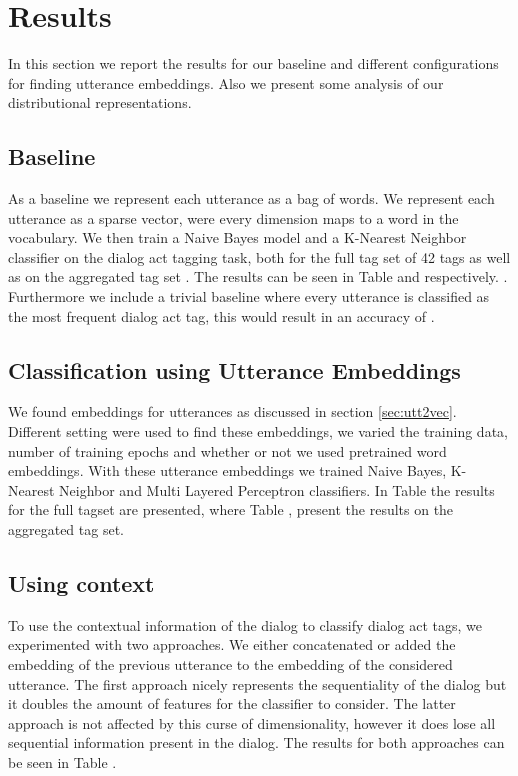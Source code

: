 \section{Results}\label{sec:results}
In this section we report the results for our baseline and different configurations for finding utterance embeddings. Also we present some analysis of our distributional representations.

\subsection{Baseline}
As a baseline we represent each utterance as a bag of words. We represent each utterance as a sparse vector, were every dimension maps to a word in the vocabulary. We then train a Naive Bayes model and a K-Nearest Neighbor classifier on the dialog act tagging task, both for the full tag set of 42 tags as well as on the aggregated tag set . The results can be seen in Table  and  respectively. . Furthermore we include a trivial baseline where every utterance is classified as the most frequent dialog act tag, this would result in an accuracy of .

\subsection{Classification using Utterance Embeddings}
We found embeddings for utterances as discussed in section \ref{sec:utt2vec}. Different setting were used to find these embeddings, we varied the training data, number of training epochs and whether or not we used pretrained word embeddings. With these utterance embeddings we trained Naive Bayes, K-Nearest Neighbor and Multi Layered Perceptron classifiers. In Table  the results for the full tagset are presented, where Table , present the results on the aggregated tag set. 

\subsection{Using context}
To use the contextual information of the dialog to classify dialog act tags, we experimented with two  approaches. We either concatenated or added the embedding of the previous utterance to the embedding of the considered utterance. The first approach nicely represents the sequentiality of the dialog but it doubles the amount of features for the classifier to consider. The latter approach is not affected by this curse of dimensionality, however it does lose all sequential information present in the dialog. The results for both approaches can be seen in Table . 


